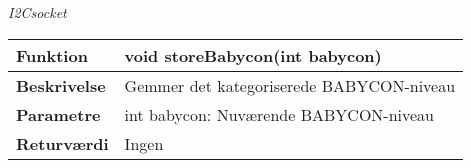 \textit{I2Csocket} \\
\begin{center}
    \begin{tabular}{ | l | p{10cm} |}
    \hline
    \textbf{Funktion}	 	& void storeBabycon(int babycon)								\\ \hline
    \textbf{Beskrivelse} 	& Gemmer det kategoriserede BABYCON-niveau						\\ \hline
    \textbf{Parametre}		& int babycon: Nuværende BABYCON-niveau							 					    \\ \hline
    \textbf{Returværdi} 	& Ingen														     \\ \hline
    \end{tabular}
\end{center}
